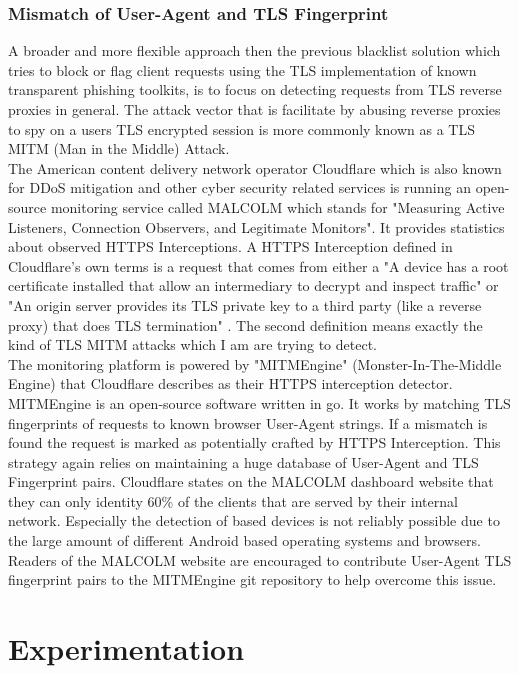 \documentclass[12pt]{scrbook}
\begin{document}
\subsection{Mismatch of User-Agent and TLS Fingerprint} A broader and
more flexible approach then the previous blacklist solution which tries to
block or flag client requests using the TLS implementation of known
transparent phishing toolkits, is to focus on detecting requests from TLS
reverse proxies in general. The attack vector that is facilitate by abusing
reverse proxies to spy on a users TLS encrypted session is more commonly known
as a TLS MITM (Man in the Middle) Attack.\\The American content delivery
network operator Cloudflare which is also known for DDoS mitigation and other
cyber security related services is running an open-source monitoring service
called MALCOLM which stands for "Measuring Active Listeners, Connection
Observers, and Legitimate Monitors". It provides statistics about observed
HTTPS Interceptions. A HTTPS Interception defined in Cloudflare's own terms is
a request that comes from either a "A device has a root certificate installed
that allow an intermediary to decrypt and inspect traffic" or "An origin
server provides its TLS private key to a third party (like a reverse proxy)
that does TLS termination" \cite{cloudflareMALCOLM}. The second definition
means exactly the kind of TLS MITM attacks which I am are trying to detect.\\The
monitoring platform is powered by "MITMEngine" (Monster-In-The-Middle Engine)
that Cloudflare describes as their HTTPS interception detector. MITMEngine is
an open-source software written in go. It works by matching TLS fingerprints
of requests to known browser User-Agent strings. If a mismatch is found the
request is marked as potentially crafted by HTTPS Interception. This strategy
again relies on maintaining a huge database of User-Agent and TLS Fingerprint
pairs. Cloudflare states on the MALCOLM dashboard website that they can only
identity 60\% of the clients that are served by their internal network.
Especially the detection of  based devices is not reliably possible due
to the large amount of different Android based operating systems and browsers.
Readers of the MALCOLM website are encouraged to contribute User-Agent TLS
fingerprint pairs to the MITMEngine git repository to help overcome this issue.

\newpage
\chapter{Experimentation}
\end{document}

